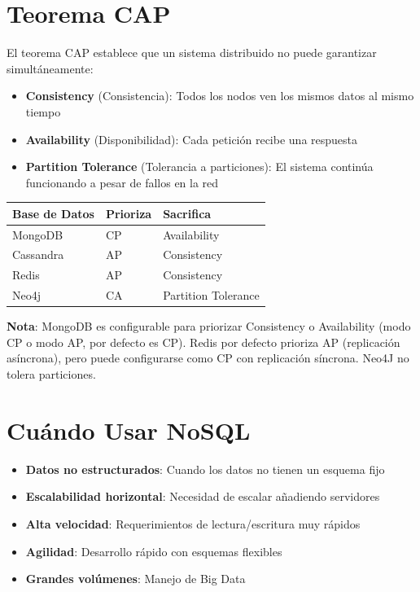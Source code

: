 \documentclass[12pt]{article}
\begin{document}
\section{Teorema CAP}
El teorema CAP establece que un sistema distribuido no puede garantizar simultáneamente:

\begin{itemize}
    \item \textbf{Consistency} (Consistencia): Todos los nodos ven los mismos datos al mismo tiempo
    \item \textbf{Availability} (Disponibilidad): Cada petición recibe una respuesta
    \item \textbf{Partition Tolerance} (Tolerancia a particiones): El sistema continúa funcionando a pesar de fallos en la red
\end{itemize}

\begin{center}
\begin{tabular}{lll}
\toprule
Base de Datos & Prioriza & Sacrifica \\
\midrule
MongoDB & CP & Availability \\
Cassandra & AP & Consistency \\
Redis & AP & Consistency \\
Neo4j & CA & Partition Tolerance \\
\bottomrule
\end{tabular}
\end{center}

\textbf{Nota}: MongoDB es configurable para priorizar Consistency o Availability (modo CP o modo AP, por defecto es CP). Redis por defecto prioriza AP (replicación asíncrona), pero puede configurarse como CP con replicación síncrona. Neo4J no tolera particiones.


\section{Cuándo Usar NoSQL}
\begin{itemize}
    \item \textbf{Datos no estructurados}: Cuando los datos no tienen un esquema fijo
    \item \textbf{Escalabilidad horizontal}: Necesidad de escalar añadiendo servidores
    \item \textbf{Alta velocidad}: Requerimientos de lectura/escritura muy rápidos
    \item \textbf{Agilidad}: Desarrollo rápido con esquemas flexibles
    \item \textbf{Grandes volúmenes}: Manejo de Big Data
\end{itemize}
\end{document}
